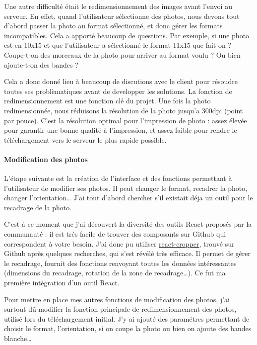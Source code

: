 \bigskip

Une autre difficulté était le redimensionnement des images avant l'envoi
au serveur. En effet, quand l'utilisateur sélectionne des photos, nous
devons tout d'abord passer la photo au format sélectionné, et donc gérer
les formats incompatibles. Cela a apporté beaucoup de questions. Par
exemple, si une photo est en 10x15 et que l'utilisateur a sélectionné le
format 11x15 que fait-on ? Coupe-t-on des morceaux de la photo pour
arriver au format voulu ? Ou bien ajoute-t-on des bandes ?

\bigskip

Cela a donc donné lieu à beaucoup de discutions avec le client pour
résoudre toutes ses problèmatiques avant de developper les solutions. La
fonction de redimensionnement est une fonction clé du projet. Une fois
la photo redimensionnée, nous réduisons la résolution de la photo
jusqu'a 300dpi (point par pouce). C'est la résolution optimal pour
l'impression de photo : assez élevée pour garantir une bonne qualité à
l'impression, et assez faible pour rendre le téléchargement vers le
serveur le plus rapide possible.

\bigskip

\paragraph{Modification des photos}\label{modification-des-photos}

\bigskip

L'étape suivante est la création de l'interface et des fonctions
permettant à l'utilisateur de modifier ses photos. Il peut changer le
format, recadrer la photo, changer l'orientation\ldots{} J'ai tout
d'abord chercher s'il existait déja un outil pour le recadrage de la
photo.

\bigskip

C'est à ce moment que j'ai découvert la diversité des outils React
proposés par la communauté : il est trés facile de trouver des
composants sur Github qui correspondent à votre besoin. J'ai donc pu
utiliser
\href{https://github.com/roadmanfong/react-cropper}{react-cropper},
trouvé sur Github après quelques recherches, qui s'est révélé très
efficace. Il permet de gérer le recadrage, fournit des fonctions
renvoyant toutes les données intéressantes (dimensions du recadrage,
rotation de la zone de recadrage\ldots{}). Ce fut ma première
intégration d'un outil React.

\bigskip

Pour mettre en place mes autres fonctions de modification des photos,
j'ai surtout dû modifier la fonction principale de redimensionnement des
photos, utilisé lors du téléchargement initial. J'y ai ajouté des
paramétres permettant de choisir le format, l'orientation, si on coupe
la photo ou bien on ajoute des bandes blanche\ldots{}

